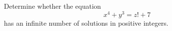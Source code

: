 Determine whether the equation $$x^4+y^3=z!+7$$has an infinite number of solutions in positive integers.